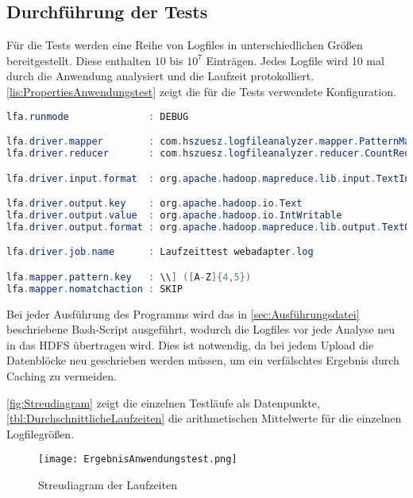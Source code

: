 \subsection{Durchführung der Tests}
Für die Tests werden eine Reihe von Logfiles in unterschiedlichen Größen bereitgestellt. Diese enthalten $10$ bis $10^7$ Einträgen. Jedes Logfile wird 10 mal durch die Anwendung analysiert und die Laufzeit protokolliert. \autoref{lis:PropertiesAnwendungstest} zeigt die für die Tests verwendete Konfiguration. \\

\begin{lstlisting}[language=Java,caption=Properties für Anwendungstest,label=lis:PropertiesAnwendungstest]
lfa.runmode              : DEBUG

lfa.driver.mapper        : com.hszuesz.logfileanalyzer.mapper.PatternMapper
lfa.driver.reducer       : com.hszuesz.logfileanalyzer.reducer.CountReducer

lfa.driver.input.format  : org.apache.hadoop.mapreduce.lib.input.TextInputFormat

lfa.driver.output.key    : org.apache.hadoop.io.Text
lfa.driver.output.value  : org.apache.hadoop.io.IntWritable
lfa.driver.output.format : org.apache.hadoop.mapreduce.lib.output.TextOutputFormat

lfa.driver.job.name      : Laufzeittest webadapter.log

lfa.mapper.pattern.key   : \\] ([A-Z]{4,5})
lfa.mapper.nomatchaction : SKIP
\end{lstlisting}

Bei jeder Ausführung des Programms wird das in \autoref{sec:Ausführungsdatei} beschriebene Bash-Script ausgeführt, wodurch die Logfiles vor jede Analyse neu in das \ac{HDFS} übertragen wird. Dies ist notwendig, da bei jedem Upload die Datenblöcke neu geschrieben werden müssen, um ein verfälschtes Ergebnis durch Caching zu vermeiden.

\autoref{fig:Streudiagram} zeigt die einzelnen Testläufe als Datenpunkte, \autoref{tbl:DurchschnittlicheLaufzeiten} die arithmetischen Mittelwerte für die einzelnen Logfilegrößen.

\begin{figure}
	\centering
	\texttt{[image: ErgebnisAnwendungstest.png]}
	\caption{Streudiagram der Laufzeiten}
	\label{fig:Streudiagram}
\end{figure}

